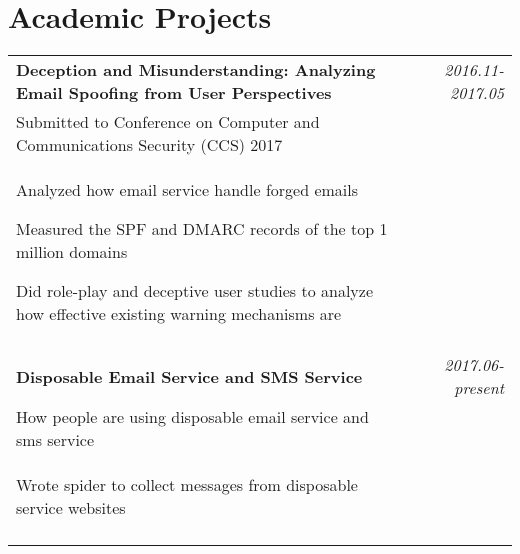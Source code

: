\documentclass[a4paper,10pt]{article}
\begin{document}
\section{Academic Projects}
\begin{tabular}{p{13.5cm}p{0.5cm}r}

\textbf{Deception and Misunderstanding: Analyzing Email Spoofing from User Perspectives} && \emph{2016.11-2017.05} \\
\hspace{1em} Submitted to Conference on Computer and Communications Security (CCS) 2017 && \vspace{-0.5em} \\
\begin{compactitem}
\item Analyzed how email service handle forged emails
\item Measured the SPF and DMARC records of the top 1 million domains
\item Did role-play and deceptive user studies to analyze how effective existing warning mechanisms are
\end{compactitem}&&\vspace{-2.2em} \\
\multicolumn{3}{c}{} \\

\textbf{Disposable Email Service and SMS Service} && \emph{2017.06-present} \\
\hspace{1em} How people are using disposable email service and sms service && \vspace{-0.5em} \\
\begin{compactitem}
\item Wrote spider to collect messages from disposable service websites
\end{compactitem}&&\vspace{-2.2em} \\
\multicolumn{3}{c}{} \\

\end{tabular}
\end{document}
